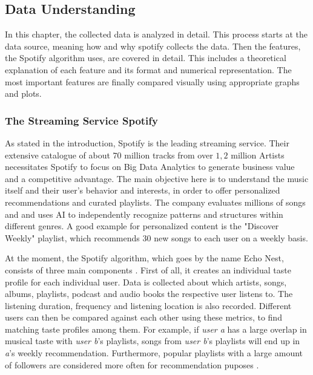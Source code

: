 \subsection{Data Understanding}

In this chapter, the collected data is analyzed in detail.
This process starts at the data source, meaning how and why spotify collects the data.
Then the features, the Spotify algorithm uses, are covered in detail.
This includes a theoretical explanation of each feature and its format and numerical representation.
The most important features are finally compared visually using appropriate graphs and plots.

\subsubsection{The Streaming Service Spotify}
As stated in the introduction, Spotify is the leading streaming service.
Their extensive catalogue of about \(70\) million tracks from over \(1,2\) million Artists
necessitates Spotify to focus on Big Data Analytics to generate business value and a competitive advantage.
The main objective here is to understand the music itself and their user's behavior and interests,
in order to offer personalized recommendations and curated playlists.
The company evaluates millions of songs and and uses AI to independently recognize
patterns and structures within different genres. 
A good example for personalized content is the "Discover Weekly" playlist, which recommends 30 new songs
to each user on a weekly basis. 

At the moment, the Spotify algorithm, which goes by the name Echo Nest,
consists of three main components \cite{Stephenson2021}.
First of all, it creates an individual taste profile for each individual user. 
Data is collected about which artists, songs, albums, playlists, podcast and audio books the
respective user listens to. The listening duration, frequency and listening location is also recorded.
Different users can then be compared against each other using these metrics, to find matching 
taste profiles among them.
For example, if \emph{user a} has a large overlap in musical taste with \emph{user b}'s playlists,
songs from \emph{user b}'s playlists will end up in \emph{a}'s weekly recommendation.
Furthermore, popular playlists with a large amount of followers are considered more often for recommendation puposes \cite[]{Stephenson2021}.

